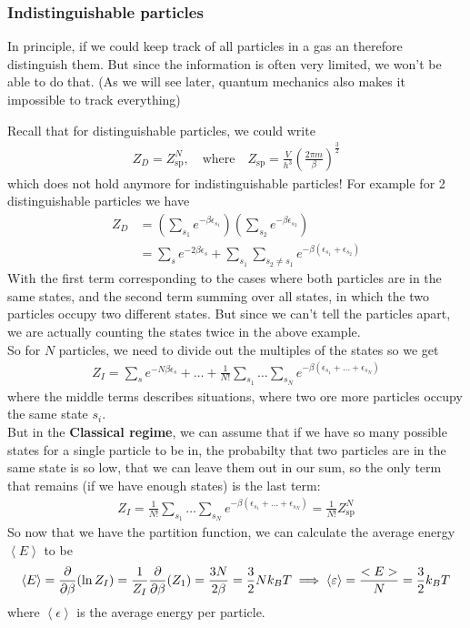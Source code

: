 
\subsubsection{Indistinguishable particles}

In principle, if we could keep track of all particles in a gas an therefore distinguish them. But since the information is often very limited, we won't be able to do that. (As we will see later, quantum mechanics also makes it impossible to track everything)

Recall that for distinguishable particles, we could write
\begin{align*}
	Z_D = Z_{\text{sp}}^N, \quad \text{where} \quad Z_{\text{sp}} = \frac{V}{h^3} \left(\frac{2 \pi m}{\beta}\right)^{\frac{3}{2}}
\end{align*}
which does not hold anymore for indistinguishable particles! For example for 2 distinguishable particles we have
\begin{align*}
	Z_D &= \left(\sum_{s_1}e^{-\beta \epsilon_{s_1}}\right) \left(\sum_{s_2}e^{-\beta \epsilon_{s_2}}\right)\\
			&= \sum_{s}e^{-2 \beta \epsilon_s} + \sum_{s_1}\sum_{s_2 \neq s_1}e^{- \beta(\epsilon_{s_1}+ \epsilon_{s_2})}
\end{align*}
With the first term corresponding to the cases where both particles are in the same states, and the second term summing over all states, in which the two particles occupy two different states. But since we can't tell the particles apart, we are actually counting the states twice in the above example.\\

So for $N$ particles, we need to divide out the multiples of the states so we get
\begin{align*}
	Z_I = \sum_{s}	e^{-N \beta \epsilon_s} + \ldots + \frac{1}{N!} \sum_{s_1} \ldots \sum_{s_N} e^{-\beta(\epsilon_{s_1} + \ldots + \epsilon_{s_N})}
\end{align*}
where the middle terms describes situations, where two ore more particles occupy the same state $s_i$.\\
But in the \textbf{Classical regime}, we can assume that if we have so many possible states for a single particle to be in, the probabilty that two particles are in the same state is so low, that we can leave them out in our sum, so the only term that remains (if we have enough states) is the last term:
\begin{align*}
	Z_I = \frac{1}{N!} \sum_{s_1} \ldots \sum_{s_N} e^{-\beta(\epsilon_{s_1} + \ldots + \epsilon_{s_N})} = \frac{1}{N!} Z_{\text{sp}}^N
\end{align*}
So now that we have the partition function, we can calculate the average energy $\left<E\right>$ to be
\begin{align*}
	\left<E\right> = \frac{\partial }{\partial \beta} (\ln Z_I) = \frac{1}{Z_I} \frac{\partial }{\partial \beta}(Z_1) = \frac{3N}{2 \beta} = \frac{3}{2} N k_B T \implies \left<\varepsilon\right> = \frac{<E>}{N} = \frac{3}{2} k_BT
\end{align*}
where $\left<\epsilon\right>$ is the average energy per particle.

